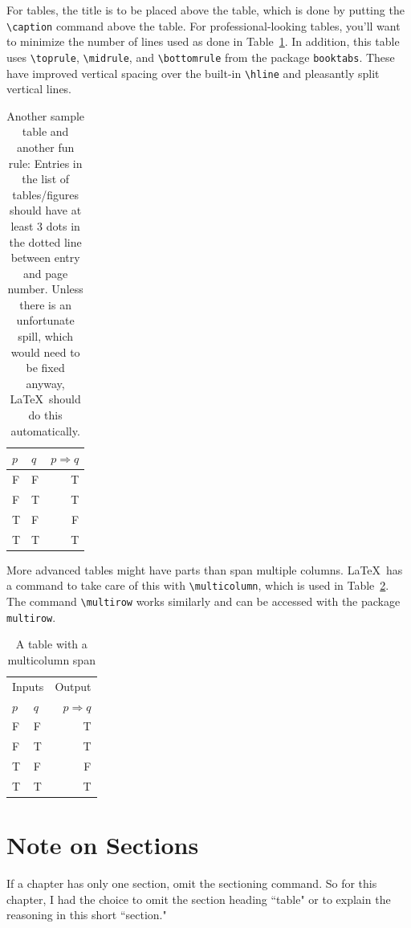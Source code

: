 For tables, the title is to be placed above the table,
which is done by putting the \verb+\caption+ command
above the table.
For professional-looking tables, you'll want to minimize
the number of lines used as done in Table~\ref{tablelabel2}.
In addition, this table uses \verb+\toprule+, \verb+\midrule+,
and \verb+\bottomrule+ from the package \verb+booktabs+. These
have improved vertical spacing over the built-in \verb+\hline+
and pleasantly split vertical lines.
\begin{table}[hbt]
	\caption{Another sample table and another fun rule:
	Entries in the list of tables/figures
	should have at least 3 dots in the dotted
	line between entry and page number. Unless there is
	an unfortunate spill, which would need to be fixed anyway,
	\LaTeX \ should do this automatically.
	}
	\label{tablelabel2}
	\centering
	\begin{tabular}{l l | r}
	\toprule
	$p$ & $q$ & $p\Rightarrow q$ \\
	\midrule
	F   & F   & T \\
	F   & T  & T \\
	T  & F   & F  \\
	T  & T  & T  \\
	\bottomrule
	\end{tabular}
\end{table}

More advanced tables might have parts than span multiple
columns. \LaTeX\ has a command to take care of this
with \verb+\multicolumn+, which is used in Table~\ref{multi}.
The command \verb+\multirow+ works similarly and can be accessed
with the package \verb+multirow+.

\begin{table}[hbt]
	\caption{A table with a multicolumn span
	}
	\label{multi}
	\centering
	\begin{tabular}{l l  r}
	\toprule
	\multicolumn{2}{c}{Inputs} & \multicolumn{1}{c}{Output}\\
	$p$ & $q$ & $p\Rightarrow q$ \\
	\midrule
	F   & F   & T \\
	F   & T  & T \\
	T  & F   & F  \\
	T  & T  & T  \\
	\bottomrule
	\end{tabular}
\end{table}

\section{Note on Sections}

If a chapter has only one section, omit the sectioning command.
So for this chapter, I had the choice to omit the section heading
``table" or to explain the reasoning in this short ``section."
